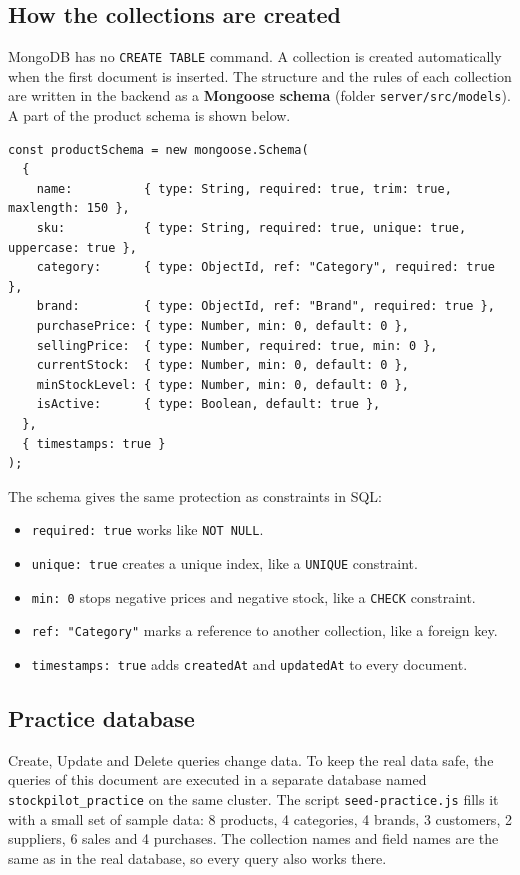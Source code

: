 \documentclass[11pt,a4paper]{article}
\newcommand{\code}[1]{\texttt{#1}}
\begin{document}
\subsection{How the collections are created}
MongoDB has no \code{CREATE TABLE} command. A collection is created automatically when the first document is inserted. The structure and the rules of each collection are written in the backend as a \textbf{Mongoose schema} (folder \code{server/src/models}). A part of the product schema is shown below.

\begin{lstlisting}[style=query]
const productSchema = new mongoose.Schema(
  {
    name:          { type: String, required: true, trim: true, maxlength: 150 },
    sku:           { type: String, required: true, unique: true, uppercase: true },
    category:      { type: ObjectId, ref: "Category", required: true },
    brand:         { type: ObjectId, ref: "Brand", required: true },
    purchasePrice: { type: Number, min: 0, default: 0 },
    sellingPrice:  { type: Number, required: true, min: 0 },
    currentStock:  { type: Number, min: 0, default: 0 },
    minStockLevel: { type: Number, min: 0, default: 0 },
    isActive:      { type: Boolean, default: true },
  },
  { timestamps: true }
);
\end{lstlisting}

The schema gives the same protection as constraints in SQL:
\begin{itemize}
  \item \code{required: true} works like \code{NOT NULL}.
  \item \code{unique: true} creates a unique index, like a \code{UNIQUE} constraint.
  \item \code{min: 0} stops negative prices and negative stock, like a \code{CHECK} constraint.
  \item \code{ref: "Category"} marks a reference to another collection, like a foreign key.
  \item \code{timestamps: true} adds \code{createdAt} and \code{updatedAt} to every document.
\end{itemize}

\subsection{Practice database}
Create, Update and Delete queries change data. To keep the real data safe, the queries of this document are executed in a separate database named \code{stockpilot\_practice} on the same cluster. The script \code{seed-practice.js} fills it with a small set of sample data: 8 products, 4 categories, 4 brands, 3 customers, 2 suppliers, 6 sales and 4 purchases. The collection names and field names are the same as in the real database, so every query also works there.
\end{document}
